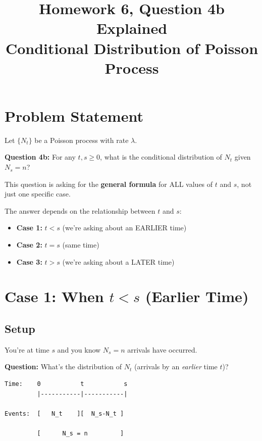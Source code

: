 \documentclass[11pt]{article}
\title{\textbf{Homework 6, Question 4b Explained} \\ \large Conditional Distribution of Poisson Process}
\author{}
\date{}
\begin{document}
\maketitle

\section{Problem Statement}

Let $\{N_t\}$ be a Poisson process with rate $\lambda$.

\textbf{Question 4b:} For any $t, s \geq 0$, what is the conditional distribution of $N_t$ given $N_s = n$?

\begin{tcolorbox}[colback=red!10!white,colframe=red!75!black,title=Key Observation]
This question is asking for the \textbf{general formula} for ALL values of $t$ and $s$, not just one specific case.

The answer depends on the relationship between $t$ and $s$:
\begin{itemize}
    \item \textbf{Case 1:} $t < s$ (we're asking about an EARLIER time)
    \item \textbf{Case 2:} $t = s$ (same time)
    \item \textbf{Case 3:} $t > s$ (we're asking about a LATER time)
\end{itemize}
\end{tcolorbox}

\section{Case 1: When $t < s$ (Earlier Time)}

\subsection{Setup}

You're at time $s$ and you know $N_s = n$ arrivals have occurred.

\textbf{Question:} What's the distribution of $N_t$ (arrivals by an \textit{earlier} time $t$)?

\begin{verbatim}
Time:    0           t           s
         |-----------|-----------|

Events:  [   N_t    ][  N_s-N_t ]

         [      N_s = n         ]
\end{verbatim}
\end{document}
